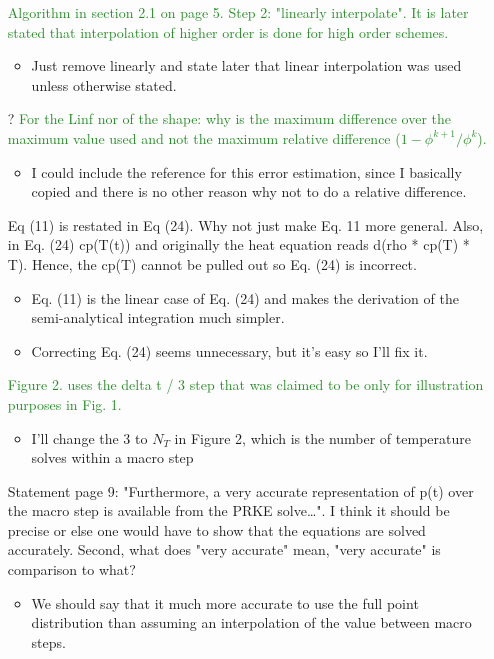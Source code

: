 \documentclass{elsarticle}
\newcommand{\fix}{\textsquare}
\newcommand{\nofix}{?}
\newcommand{\easy}[1]{\textcolor{ForestGreen}{#1}}
\newcommand{\medm}[1]{\textcolor{BurntOrange}{#1}}
\begin{document}
\begin{itemize}
\item[\fix] \easy{ Algorithm in section 2.1 on page 5. Step 2: "linearly interpolate". It is later stated that interpolation of higher order is done for high order schemes. }
\begin{itemize}
\item Just remove linearly and state later that linear interpolation was used unless otherwise stated.
\end{itemize}

\item[\nofix] \easy{ For the Linf nor of the shape: why is the maximum difference over the maximum value used and not the maximum relative difference ($1 - \phi^{k+1}/\phi^k$). }
\begin{itemize}
\item I could include the reference for this error estimation, since I basically copied and there is no other reason why not to do a relative difference.
\end{itemize}


\item[\fix] \medm{ Eq (11) is restated in Eq (24). Why not just make Eq. 11 more general. Also, in Eq. (24) cp(T(t)) and originally the heat equation reads d(rho * cp(T) * T). Hence, the cp(T) cannot be pulled out so Eq. (24) is incorrect. }
\begin{itemize}
\item Eq. (11) is the linear case of Eq. (24) and makes the derivation of the semi-analytical integration much simpler.
\item Correcting Eq. (24) seems unnecessary, but it's easy so I'll fix it.
\end{itemize}

\item[\fix] \easy{ Figure 2. uses the delta t / 3 step that was claimed to be only for illustration purposes in Fig. 1. }
\begin{itemize}
\item I'll change the 3 to $N_{T}$ in Figure 2, which is the number of temperature solves within a macro step
\end{itemize}

\item[\fix] \medm{ Statement page 9: "Furthermore, a very accurate representation of p(t) over the macro step is available from the PRKE solve…". I think it should be precise or else one would have to show that the equations are solved accurately. Second, what does "very accurate" mean, "very accurate" is comparison to what? }
\begin{itemize}
\item We should say that it much more accurate to use the full point distribution than assuming an interpolation of the value between macro steps.
\end{itemize}


\end{itemize}
\end{document}
